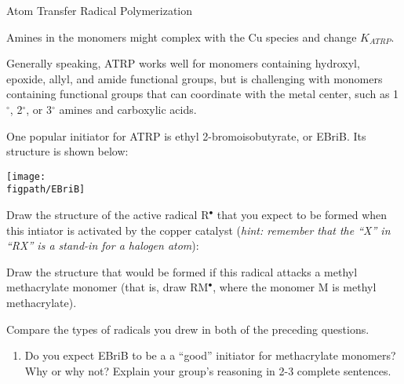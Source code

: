 \begin{activity}{Atom Transfer Radical Polymerization}
\begin{ctqs}
		\begin{solution}[1.25in]
			Amines in the monomers might complex with the Cu species and change $K_{ATRP}$.
			
			Generally speaking, ATRP works well for monomers containing hydroxyl, epoxide, allyl, and amide functional groups, but is challenging with monomers containing functional groups that can coordinate with the metal center, such as 1$^\circ$, 2$^\circ$, or 3$^\circ$ amines and carboxylic acids.
		\end{solution}
	
\end{ctqs}

\begin{infobox}
	One popular initiator for ATRP is ethyl 2-bromoisobutyrate, or EBriB.  Its structure is shown below:
	
	\centerline{\texttt{[image: \\figpath/EBriB]}}
\end{infobox}

\begin{ctqs}
	\question Draw the structure of the active radical R$^\bullet$ that you expect to be formed when this intiator is activated by the copper catalyst (\emph{hint: remember that the ``X'' in ``RX'' is a stand-in for a halogen atom}): \label{\labelbase:ctq:ATRPinit}
	
		\begin{solution}[0.5in]
		\studentdisplay{~}
		\end{solution}
	
	\question Draw the structure that would be formed if this radical attacks a methyl methacrylate monomer (that is, draw RM$^\bullet$, where the monomer M is methyl methacrylate). \label{\labelbase:ctq:ATRPprop}
	
		\begin{solution}[1in]
		\studentdisplay{~}
		\end{solution}
	
	\question Compare the types of radicals you drew in both of the preceding questions.
	
		\begin{enumerate}
			\item Do you expect EBriB to be a a ``good'' initiator for methacrylate monomers?  Why or why not?  Explain your group's reasoning in 2-3 complete sentences.
	

\end{enumerate}
\end{ctqs}
\end{activity}

